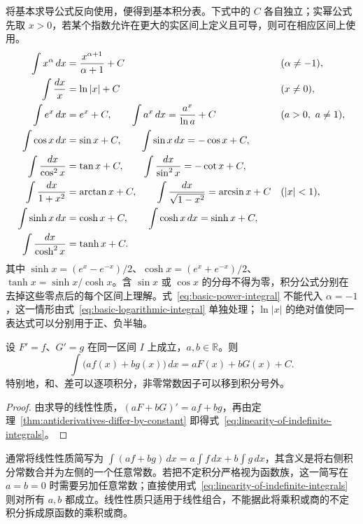 将基本求导公式反向使用，便得到基本积分表。下式中的 $C$ 各自独立；实幂公式先取 $x>0$，若某个指数允许在更大的实区间上定义且可导，则可在相应区间上使用。
\begin{align}
    \int x^\alpha\,dx&=\frac{x^{\alpha+1}}{\alpha+1}+C
        &&(\alpha\neq-1),\label{eq:basic-power-integral}\\
    \int\frac{dx}{x}&=\ln|x|+C
        &&(x\neq0),\label{eq:basic-logarithmic-integral}\\
    \int e^x\,dx&=e^x+C,\qquad
    \int a^x\,dx=\frac{a^x}{\ln a}+C
        &&(a>0,\ a\neq1),\notag\\
    \int\cos x\,dx&=\sin x+C,\qquad
    \int\sin x\,dx=-\cos x+C,\notag\\
    \int\frac{dx}{\cos^2x}&=\tan x+C,\qquad
    \int\frac{dx}{\sin^2x}=-\cot x+C,\notag\\
    \int\frac{dx}{1+x^2}&=\arctan x+C,\qquad
    \int\frac{dx}{\sqrt{1-x^2}}=\arcsin x+C
        &&(|x|<1),\notag\\
    \int\sinh x\,dx&=\cosh x+C,\qquad
    \int\cosh x\,dx=\sinh x+C,\notag\\
    \int\frac{dx}{\cosh^2x}&=\tanh x+C.
        \label{eq:basic-hyperbolic-integrals}
\end{align}
其中 $\sinh x=(e^x-e^{-x})/2$、$\cosh x=(e^x+e^{-x})/2$、$\tanh x=\sinh x/\cosh x$。含 $\sin x$ 或 $\cos x$ 的分母不得为零，积分公式分别在去掉这些零点后的每个区间上理解。式~\eqref{eq:basic-power-integral} 不能代入 $\alpha=-1$，这一情形由式~\eqref{eq:basic-logarithmic-integral} 单独处理；$\ln|x|$ 的绝对值使同一表达式可以分别用于正、负半轴。

\begin{proposition}[不定积分的线性性质]
\label{prop:linearity-of-indefinite-integrals}
设 $F'=f$、$G'=g$ 在同一区间 $I$ 上成立，$a,b\in\mathbb{R}$。则
\begin{equation}
    \int\bigl(af(x)+bg(x)\bigr)\,dx=aF(x)+bG(x)+C.
    \label{eq:linearity-of-indefinite-integrals}
\end{equation}
特别地，和、差可以逐项积分，非零常数因子可以移到积分号外。
\end{proposition}

\begin{proof}
由求导的线性性质，$(aF+bG)'=af+bg$，再由定理~\ref{thm:antiderivatives-differ-by-constant} 即得式~\eqref{eq:linearity-of-indefinite-integrals}。
\end{proof}

通常将线性性质简写为 $\int(af+bg)\,dx=a\int f\,dx+b\int g\,dx$，其含义是将右侧积分常数合并为左侧的一个任意常数。若把不定积分严格视为函数族，这一简写在 $a=b=0$ 时需要另加任意常数；直接使用式~\eqref{eq:linearity-of-indefinite-integrals} 则对所有 $a,b$ 都成立。线性性质只适用于线性组合，不能据此将乘积或商的不定积分拆成原函数的乘积或商。

